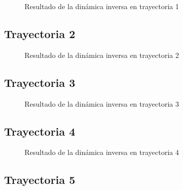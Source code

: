         \begin{figure}[h]
            \centering
            
            \caption{Resultado de la dinámica inversa en trayectoria 1}
            \label{f:cap7_tray1}
        \end{figure}

        \newpage

                
    \subsection{Trayectoria 2}
    
        \begin{figure}[h]
            \centering
            
            \caption{Resultado de la dinámica inversa en trayectoria 2}
            \label{f:cap7_tray2}
        \end{figure}
        

        
    \subsection{Trayectoria 3}
    
        \begin{figure}[h]
            \centering
            
            \caption{Resultado de la dinámica inversa en trayectoria 3}
            \label{f:cap7_tray3}
        \end{figure}

        \newpage

                
    \subsection{Trayectoria 4}
    
        \begin{figure}[h]
            \centering
            
            \caption{Resultado de la dinámica inversa en trayectoria 4}
            \label{f:cap7_tray4}
        \end{figure}
        

    \subsection{Trayectoria 5}
    
